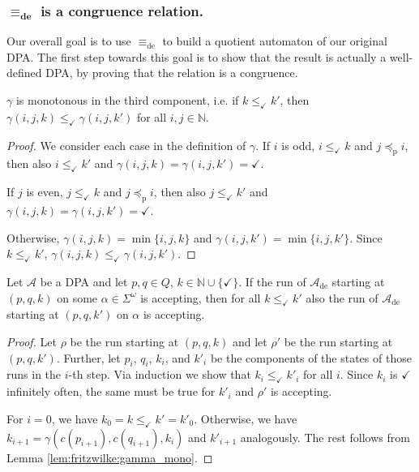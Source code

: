 \vspace{1cm}
\subsubsection*{$\boldsymbol{\equiv_\text{de}}$ is a congruence relation.}
Our overall goal is to use $\equiv_\text{de}$ to build a quotient automaton of our original DPA. The first step towards this goal is to show that the result is actually a well-defined DPA, by proving that the relation is a congruence.

\begin{lem}
\label{lem:fritzwilke:gamma_mono}
	$\gamma$ is monotonous in the third component, i.e. if $k \leq_\checkmark k'$, then $\gamma(i, j, k) \leq_\checkmark \gamma(i, j, k')$ for all $i, j \in \mathbb{N}$.
\end{lem}

\begin{proof}
	We consider each case in the definition of $\gamma$. If $i$ is odd, $i \leq_\checkmark k$ and $j \preceq_\text{p} i$, then also $i \leq_\checkmark k'$ and $\gamma(i, j, k) = \gamma(i, j, k') = \checkmark$.
	
	If $j$ is even, $j \leq_\checkmark k$ and $j \preceq_\text{p} i$, then also $j \leq_\checkmark k'$ and $\gamma(i, j, k) = \gamma(i, j, k') = \checkmark$.
	
	Otherwise, $\gamma(i, j, k) = \min \{i, j, k\}$ and $\gamma(i, j, k') = \min \{i, j, k'\}$. Since $k \leq_\checkmark k'$, $\gamma(i, j, k) \leq_\checkmark \gamma(i, j, k')$.
\end{proof}

\begin{lem}
\label{lem:fritzwilke:gamma_mono_ext}
	Let $\mathcal{A}$ be a DPA and let $p, q \in Q$, $k \in \mathbb{N} \cup \{\checkmark\}$. If the run of $\mathcal{A}_\text{de}$ starting at $(p, q, k)$ on some $\alpha \in \Sigma^\omega$ is accepting, then for all $k \leq_\checkmark k'$ also the run of $\mathcal{A}_\text{de}$ starting at $(p, q, k')$ on $\alpha$ is accepting.
\end{lem}

\begin{proof}
	Let $\rho$ be the run starting at $(p, q, k)$ and let $\rho'$ be the run starting at $(p, q, k')$. Further, let $p_i$, $q_i$, $k_i$, and $k'_i$ be the components of the states of those runs in the $i$-th step. Via induction we show that $k_i \leq_\checkmark k'_i$ for all $i$. Since $k_i$ is $\checkmark$ infinitely often, the same must be true for $k'_i$ and $\rho'$ is accepting.
	
	For $i = 0$, we have $k_0 = k \leq_\checkmark k' = k'_0$. Otherwise, we have $k_{i+1} = \gamma(c(p_{i+1}), c(q_{i+1}), k_i)$ and $k'_{i+1}$ analogously. The rest follows from Lemma \ref{lem:fritzwilke:gamma_mono}.
\end{proof}

